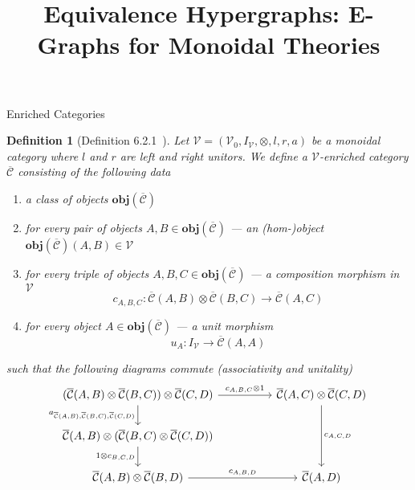 \documentclass[acmsmall, screen, nonacm]{acmart}
\newcommand\obj[1]{{\textbf{obj}(#1)}}
\newtheorem{definition}[theorem]{Definition}
\newcommand\enriched[1]{{\overline{\mathcal{#1}}}}
\begin{document}
\title{Equivalence Hypergraphs: E-Graphs for Monoidal Theories}

\maketitle



\begin{section}{Enriched Categories}

\begin{definition}[Definition 6.2.1~\cite{Borceux_1994}]
  Let $\mathcal{V} = (\mathcal{V}_{0}, I_{\mathcal{V}}, \otimes, l, r, a)$ be a monoidal category where $l$ and $r$ are left and right unitors.
  We define a $\mathcal{V}$-enriched category $\enriched{C}$ consisting of the following data
  \begin{enumerate}
    \item a class of objects $\obj{\enriched{C}}$
    \item for every pair of objects $A,B \in \obj{\enriched{C}}$ --- an (hom-)object $\obj{\enriched{C}}(A,B) \in \mathcal{V}$
    \item for every triple of objects $A,B,C \in \obj{\enriched{C}}$ --- a composition morphism in $\mathcal{V}$
    \[
    c_{A,B,C} : \enriched{C}(A,B) \otimes \enriched{C}(B,C) \to \enriched{C}(A,C)
    \]
    \item for every object $A \in \obj{\enriched{C}}$ --- a unit morphism
    \[
      u_{A} : I_{\mathcal{V}} \to \enriched{C}(A,A)
    \]
  \end{enumerate}
  such that the following diagrams commute (associativity and unitality)
  \[
  \begin{tikzcd}
    {(\enriched{C}(A,B) \otimes \enriched{C}(B,C)) \otimes \enriched{C}(C,D)} \arrow[rr, "{c_{A,B,C} \otimes 1}"] \arrow[d, "{a_{\enriched{C}(A,B),\enriched{C}(B,C),\enriched{C}(C,D)}}"']   &  & {\enriched{C}(A,C) \otimes \enriched{C}(C,D)} \arrow[dd, "{c_{A,C,D}}"]                                                                                     \\
    {\enriched{C}(A,B) \otimes (\enriched{C}(B,C) \otimes \enriched{C}(C,D))} \arrow[d, "{1\otimes c_{B,C,D}}"']                                             &  &                                                                                                                                       \\
    {\enriched{C}(A,B) \otimes \enriched{C}(B,D)} \arrow[rr, "{c_{A,B,D}}"]                                                                       &  & {\enriched{C}(A,D)}                                                                                                                             
  \end{tikzcd}
  \]


\end{definition}
\end{section}
\end{document}
